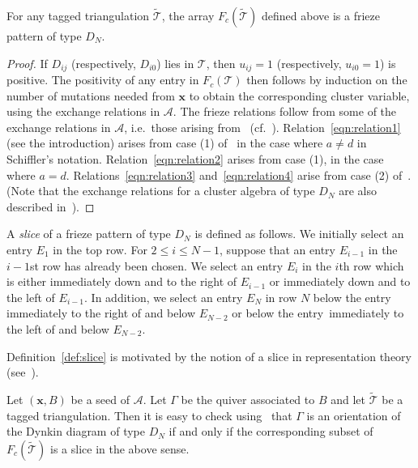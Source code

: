 \documentclass[a4paper]{amsart}
\begin{document}
\begin{prop} \label{prop:clusterrelations}
For any tagged triangulation $\widetilde{\mathcal T}$, the array $F_c(\widetilde{\mathcal T})$
defined above is a frieze pattern of type $D_N$.
\end{prop}

\begin{proof}
If $D_{ij}$ (respectively, $D_{i0}$) lies in ${\mathcal T}$, then $u_{ij}=1$
(respectively, $u_{i0}=1$) is positive.
The positivity of any entry in $F_c({\mathcal T})$ then follows by
induction on the number of mutations needed from $\mathbf{x}$ to obtain the
corresponding cluster variable, using the exchange relations in $\mathcal{A}$.
The frieze relations follow from some of the exchange relations
in $\mathcal{A}$, i.e.\ those arising
from~\cite[5.1, 5.2]{schiffler06} (cf.~\cite{bmr04}).
Relation~\eqref{eqn:relation1} (see the introduction) arises from case (1)
of~\cite[5.1]{schiffler06} in the case where $a\neq d$ in Schiffler's
notation. Relation~\eqref{eqn:relation2} arises from case (1),
in the case where $a=d$.
Relations~\eqref{eqn:relation3} and~\eqref{eqn:relation4}
arise from case (2) of~\cite[5.1]{schiffler06}. (Note that the
exchange relations for a cluster algebra of type $D_N$ are also described
in~\cite[12.4]{fominzelevinsky03}).
\end{proof}

\begin{definition} \label{def:slice}
A \emph{slice} of a frieze pattern of type $D_N$ is defined as follows.
We initially select an entry $E_1$ in the top row.
For $2\leq i\leq N-1$, suppose that an entry $E_{i-1}$ in the
$i-1$st row has already been chosen. We select an entry $E_i$ in the
$i$th row which is either immediately down and to the right of $E_{i-1}$
or immediately down and to the left of $E_{i-1}$.
In addition, we select an entry $E_N$ in row $N$ below the entry
immediately to the right of and below $E_{N-2}$ or below the entry\
immediately to the left of and below $E_{N-2}$. 
\end{definition}

Definition~\ref{def:slice} is motivated by the notion of a slice in
representation theory (see~\cite{ringel84}).

\begin{remark}
Let $(\mathbf{x},B)$ be a seed of $\mathcal{A}$. Let $\Gamma$ be the
quiver associated to $B$ and let $\widetilde{\mathcal T}$ be a tagged triangulation.
Then it is easy to check using~\cite[9.6]{fst06} that
$\Gamma$ is an orientation of the Dynkin diagram of type $D_N$ if and only
if the corresponding subset of $F_c(\widetilde{\mathcal T})$ is a slice in
the above sense.
\end{remark}
\end{document}

